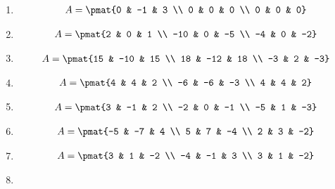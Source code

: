 \begin{enumerate}
\item

\begin{align*}
A = \pmat{0 & -1 & 3 \\ 0 & 0 & 0 \\ 0 & 0 & 0}
\end{align*}

\item

\begin{align*}
A = \pmat{2 & 0 & 1 \\ -10 & 0 & -5 \\ -4 & 0 & -2}
\end{align*}

\item

\begin{align*}
A = \pmat{15 & -10 & 15 \\ 18 & -12 & 18 \\ -3 & 2 & -3}
\end{align*}

\item

\begin{align*}
A = \pmat{4 & 4 & 2 \\ -6 & -6 & -3 \\ 4 & 4 & 2}
\end{align*}

\item

\begin{align*}
A = \pmat{3 & -1 & 2 \\ -2 & 0 & -1 \\ -5 & 1 & -3}
\end{align*}

\item

\begin{align*}
A = \pmat{-5 & -7 & 4 \\ 5 & 7 & -4 \\ 2 & 3 & -2}
\end{align*}

\item

\begin{align*}
A = \pmat{3 & 1 & -2 \\ -4 & -1 & 3 \\ 3 & 1 & -2}
\end{align*}

\item


\end{enumerate}
